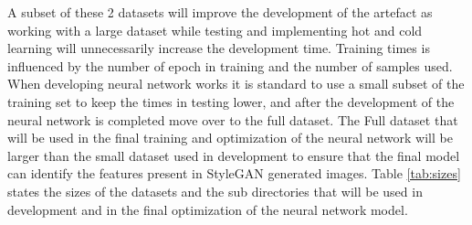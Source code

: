 A subset of these 2 datasets will improve the development of the artefact as working with a large dataset while testing and implementing hot and cold learning will unnecessarily increase the development time. Training times is influenced by the number of epoch in training and the number of samples used. When developing neural network works it is standard to use a small subset of the training set to keep the times in testing lower, and after the development of the neural network is completed move over to the full dataset. The Full dataset that will be used in the final training and optimization of the neural network will be larger than the small dataset used in development to ensure that the final model can identify the features present in StyleGAN generated images. Table \ref{tab:sizes} states the sizes of the datasets and the sub directories that will be used in development and in the final optimization of the neural network model. 

\begin{table}[H]
\caption{Total amount of images used in the Artefact creation}
\label{tab:sizes}
\end{table}


